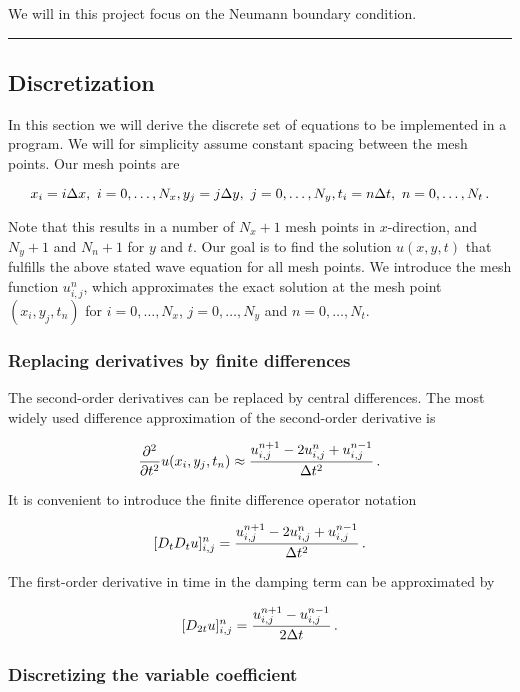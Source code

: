\documentclass[letterpaper,10pt,english]{/usr/share/sphinx/texinputs/sphinxhowto}
\begin{document}
We will in this project focus on the Neumann boundary condition.\begin{center}\rule{3in}{0.4pt}\end{center}

\subsection{Discretization}

In this section we will derive the discrete set of equations to be
implemented in a program. We will for simplicity assume constant spacing
between the mesh points. Our mesh points are

\[
x_i = i\Delta x,\ i=0,\ldots,N_x,\quad \\ 
y_j = j\Delta y,\ j=0,\ldots,N_y,\quad \\
t_i = n\Delta t,\ n=0,\ldots,N_t{\thinspace .}
\]

Note that this results in a number of $N_x + 1$ mesh points in
$x$-direction, and $N_y + 1$ and $N_n + 1$ for $y$ and $t$. Our goal is
to find the solution $u(x,y,t)$ that fulfills the above stated wave
equation for all mesh points. We introduce the mesh function
$u_{i,j}^n$, which approximates the exact solution at the mesh point
$(x_i,y_j,t_n)$ for $i=0,\ldots,N_x$, $j=0,\ldots,N_y$ and
$n=0,\ldots,N_t$.\subsubsection{Replacing derivatives by finite differences}

The second-order derivatives can be replaced by central differences. The
most widely used difference approximation of the second-order derivative
is

\[
\frac{\partial^2}{\partial t^2}u(x_i,y_j,t_n)\approx
\frac{u_{i,j}^{n+1} - 2u_{i,j}^n + u^{n-1}_{i,j}}{\Delta t^2}{\thinspace .}
\]

It is convenient to introduce the finite difference operator notation

\[
[D_tD_t u]^n_{i,j} = \frac{u_{i,j}^{n+1} - 2u_{i,j}^n + u^{n-1}_{i,j}}{\Delta t^2}{\thinspace .}
\]

The first-order derivative in time in the damping term can be
approximated by

\[
[D_{2t} u]^n_{i,j} = \frac{u_{i,j}^{n+1} - u^{n-1}_{i,j}}  {2\Delta t}{\thinspace .}
\]\subsubsection{Discretizing the variable coefficient}
\end{document}
